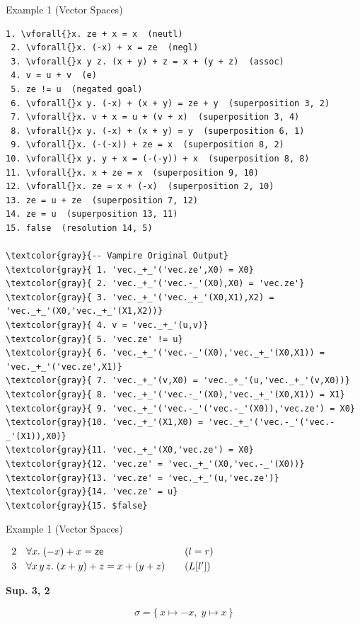 \documentclass[aspectratio=43]{beamer}
\newcommand{\vforall}{\makebox[\fontcharwd\font`x]{$\forall$}}
\begin{document}
\begin{frame}[fragile]{Example 1 (Vector Spaces)}
\begin{Verbatim}[fontsize=\fontsize{5}{6}\selectfont, frame=single, commandchars=\\\{\}]
 1. \vforall{}x. ze + x = x  (neutl)
 2. \vforall{}x. (-x) + x = ze  (negl)
 3. \vforall{}x y z. (x + y) + z = x + (y + z)  (assoc)
 4. v = u + v  (e)
 5. ze != u  (negated goal)
 6. \vforall{}x y. (-x) + (x + y) = ze + y  (superposition 3, 2)
 7. \vforall{}x. v + x = u + (v + x)  (superposition 3, 4)
 8. \vforall{}x y. (-x) + (x + y) = y  (superposition 6, 1)
 9. \vforall{}x. (-(-x)) + ze = x  (superposition 8, 2)
10. \vforall{}x y. y + x = (-(-y)) + x  (superposition 8, 8)
11. \vforall{}x. x + ze = x  (superposition 9, 10)
12. \vforall{}x. ze = x + (-x)  (superposition 2, 10)
13. ze = u + ze  (superposition 7, 12)
14. ze = u  (superposition 13, 11)
15. false  (resolution 14, 5)

\textcolor{gray}{-- Vampire Original Output}
\textcolor{gray}{ 1. 'vec._+_'('vec.ze',X0) = X0}
\textcolor{gray}{ 2. 'vec._+_'('vec.-_'(X0),X0) = 'vec.ze'}
\textcolor{gray}{ 3. 'vec._+_'('vec._+_'(X0,X1),X2) = 'vec._+_'(X0,'vec._+_'(X1,X2))}
\textcolor{gray}{ 4. v = 'vec._+_'(u,v)}
\textcolor{gray}{ 5. 'vec.ze' != u}
\textcolor{gray}{ 6. 'vec._+_'('vec.-_'(X0),'vec._+_'(X0,X1)) = 'vec._+_'('vec.ze',X1)}
\textcolor{gray}{ 7. 'vec._+_'(v,X0) = 'vec._+_'(u,'vec._+_'(v,X0))}
\textcolor{gray}{ 8. 'vec._+_'('vec.-_'(X0),'vec._+_'(X0,X1)) = X1}
\textcolor{gray}{ 9. 'vec._+_'('vec.-_'('vec.-_'(X0)),'vec.ze') = X0}
\textcolor{gray}{10. 'vec._+_'(X1,X0) = 'vec._+_'('vec.-_'('vec.-_'(X1)),X0)}
\textcolor{gray}{11. 'vec._+_'(X0,'vec.ze') = X0}
\textcolor{gray}{12. 'vec.ze' = 'vec._+_'(X0,'vec.-_'(X0))}
\textcolor{gray}{13. 'vec.ze' = 'vec._+_'(u,'vec.ze')}
\textcolor{gray}{14. 'vec.ze' = u}
\textcolor{gray}{15. $false}
\end{Verbatim}
\end{frame}

\begin{frame}{Example 1 (Vector Spaces)}
    \footnotesize
    \begin{center}
    $\begin{array}{r@{\quad}l@{\qquad}l}
      2 & \forall x.\; (-x) + x = \mathsf{ze}        & (l = r)\\[3pt]
      3 & \forall x\,y\,z.\; (x+y)+z = x+(y+z)       & (L[l'])
    \end{array}$
    \end{center}
    \vspace{4pt}
    \textbf{Sup. 3, 2}
    \begin{mathpar}
    \end{mathpar}
    \[\sigma = \{\, x \mapsto -x,\; y \mapsto x \,\}\]
    \begin{mathpar}
    \end{mathpar}
\end{frame}
\end{document}
